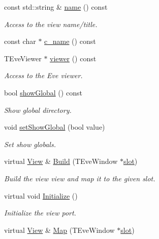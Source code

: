 \begin{DoxyCompactItemize}
const std\+::string \& \hyperlink{class_d_d4hep_1_1_view_ae369eadf16399a6bf34f1ce491b7a788}{name} () const
\begin{DoxyCompactList}\small\item\em Access to the view name/title. \end{DoxyCompactList}\item 
const char $\ast$ \hyperlink{class_d_d4hep_1_1_view_ae2b74b1545ffe88efa6e28f7ab7b1af8}{c\+\_\+name} () const
\item 
T\+Eve\+Viewer $\ast$ \hyperlink{class_d_d4hep_1_1_view_a36a5945d05049da6f7e84618c3aea3a3}{viewer} () const
\begin{DoxyCompactList}\small\item\em Access to the Eve viewer. \end{DoxyCompactList}\item 
bool \hyperlink{class_d_d4hep_1_1_view_af94c772b1eaa6fbd595fa606da194282}{show\+Global} () const
\begin{DoxyCompactList}\small\item\em Show global directory. \end{DoxyCompactList}\item 
void \hyperlink{class_d_d4hep_1_1_view_a76019e28799e7a10d7678a251edb198d}{set\+Show\+Global} (bool value)
\begin{DoxyCompactList}\small\item\em Set show globals. \end{DoxyCompactList}\item 
virtual \hyperlink{class_d_d4hep_1_1_view}{View} \& \hyperlink{class_d_d4hep_1_1_view_ab4e12874a9cb6a599f268b027443c6ce}{Build} (T\+Eve\+Window $\ast$\hyperlink{_multi_view_8cpp_a402e7b855ac7bcf09e2ecf5e98220a11}{slot})
\begin{DoxyCompactList}\small\item\em Build the view view and map it to the given slot. \end{DoxyCompactList}\item 
virtual void \hyperlink{class_d_d4hep_1_1_view_a7a968707a03a2fb140df5f4264708a20}{Initialize} ()
\begin{DoxyCompactList}\small\item\em Initialize the view port. \end{DoxyCompactList}\item 
virtual \hyperlink{class_d_d4hep_1_1_view}{View} \& \hyperlink{class_d_d4hep_1_1_view_a570467ad2be3126bca9aa3563338bcd2}{Map} (T\+Eve\+Window $\ast$\hyperlink{_multi_view_8cpp_a402e7b855ac7bcf09e2ecf5e98220a11}{slot})

\end{DoxyCompactItemize}

